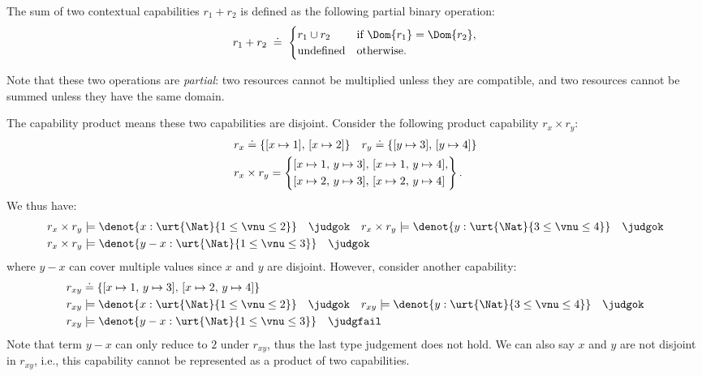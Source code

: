 \begin{definition}\label{def:contextual-capabilities-sum}
  The sum of two contextual capabilities $r_1 + r_2$ is defined
  as the following partial binary operation:
  \[
    r_1 + r_2 \;\doteq\;
    \begin{cases}
      r_1 \cup r_2
        & \text{if } \Dom{r_1} = \Dom{r_2}, \\
        \text{undefined}
        & \text{otherwise.}
      \end{cases}
  \]
\end{definition}

Note that these two operations are \emph{partial}: two resources
cannot be multiplied unless they are compatible, and two resources
cannot be summed unless they have the same domain.

\begin{example}\label{ex-capability-disjointness} The capability product means these two capabilities are disjoint. Consider the following product capability $r_x \times r_y$:
\begin{align*}
  &r_x \doteq \{[x \mapsto 1],\, [x \mapsto 2]\} \quad r_y \doteq \{[y \mapsto 3],\, [y \mapsto 4]\} 
  \\&r_x \times r_y
    = \left\{
      \begin{array}{@{}l@{}}
        [x \mapsto 1,\, y \mapsto 3],\,
        [x \mapsto 1,\, y \mapsto 4],\\[\jot]
        [x \mapsto 2,\, y \mapsto 3],\,
        [x \mapsto 2,\, y \mapsto 4]
      \end{array}
    \right\}.
\end{align*}\noindent
We thus have:
\begin{align*}
  &r_x \times r_y \models \denot{x : \urt{\Nat}{1 \leq \vnu \leq 2}} \quad \judgok \quad r_x \times r_y \models \denot{y : \urt{\Nat}{3 \leq \vnu \leq 4}} \quad \judgok
  \\&r_x \times r_y \models \denot{y - x : \urt{\Nat}{1 \leq \vnu \leq 3}} \quad \judgok
\end{align*}\noindent
where $y - x$ can cover multiple values since $x$ and $y$ are disjoint. However, consider another capability:
\begin{align*}
  &r_{xy} \doteq \{[x \mapsto 1,\, y \mapsto 3],\, [x \mapsto 2,\, y \mapsto 4]\}
  \\&r_{xy} \models \denot{x : \urt{\Nat}{1 \leq \vnu \leq 2}} \quad \judgok \quad r_{xy} \models \denot{y : \urt{\Nat}{3 \leq \vnu \leq 4}} \quad \judgok
  \\&r_{xy} \models \denot{y - x : \urt{\Nat}{1 \leq \vnu \leq 3}} \quad \judgfail
\end{align*}\noindent
Note that term $y - x$ can only reduce to $2$ under $r_{xy}$, thus the last type judgement does not hold. We can also say $x$ and $y$ are not disjoint in $r_{xy}$, i.e., this capability cannot be represented as a product of two capabilities.
\end{example}


